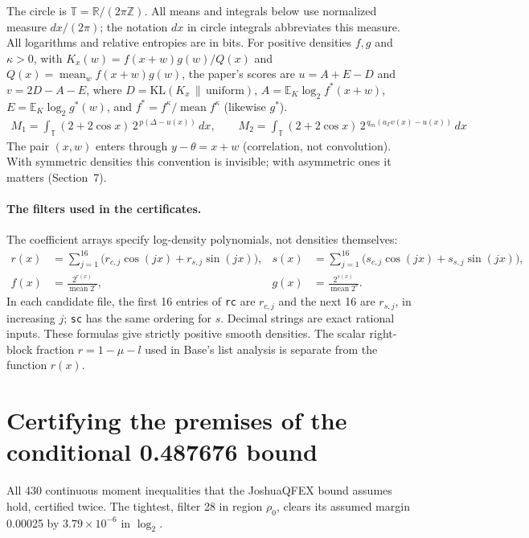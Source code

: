 \documentclass[11pt]{article}
\DeclareMathOperator{\mean}{mean}
\newcommand{\E}{\mathbb{E}}
\newcommand{\KL}{\mathrm{KL}}
\theoremstyle{plain}
\begin{document}
The circle is $\mathbb T=\mathbb R/(2\pi\mathbb Z)$. All means and integrals below use normalized measure $dx/(2\pi)$; the notation $dx$ in circle integrals abbreviates this measure. All logarithms and relative entropies are in bits. For positive densities $f, g$ and $\kappa > 0$, with $K_x(w) = f(x+w)g(w)/Q(x)$ and $Q(x) = \mean_w f(x+w)g(w)$, the paper's scores are $u = A + E - D$ and $v = 2D - A - E$, where $D = \KL(K_x \,\|\, \mathrm{uniform})$, $A = \E_K \log_2 f^*(x+w)$, $E = \E_K \log_2 g^*(w)$, and $f^* = f^\kappa / \mean f^\kappa$ (likewise $g^*$).
\begin{gather*}
M_1 = \int_{\mathbb T} (2+2\cos x)\, 2^{\,p(\Delta - u(x))}\, dx, \qquad M_2 = \int_{\mathbb T} (2+2\cos x)\, 2^{\,q_m(a_\Gamma v(x) - u(x))}\, dx
\end{gather*}
The pair $(x, w)$ enters through $y - \theta = x + w$ (correlation, not convolution). With symmetric densities this convention is invisible; with asymmetric ones it matters (Section~7).

\paragraph{The filters used in the certificates.}
The coefficient arrays specify log-density polynomials, not densities themselves:
\begin{align*}
r(x)&=\sum_{j=1}^{16}\bigl(r_{c,j}\cos(jx)+r_{s,j}\sin(jx)\bigr),&
s(x)&=\sum_{j=1}^{16}\bigl(s_{c,j}\cos(jx)+s_{s,j}\sin(jx)\bigr),\\
f(x)&=\frac{2^{r(x)}}{\mean 2^r},&g(x)&=\frac{2^{s(x)}}{\mean 2^s}.
\end{align*}
In each candidate file, the first 16 entries of \texttt{rc} are $r_{c,j}$ and the next 16 are $r_{s,j}$, in increasing $j$; \texttt{sc} has the same ordering for $s$. Decimal strings are exact rational inputs. These formulas give strictly positive smooth densities. The scalar right-block fraction $r=1-\mu-l$ used in Base's list analysis is separate from the function $r(x)$.


\section{Certifying the premises of the conditional 0.487676 bound}

All 430 continuous moment inequalities that the JoshuaQFEX bound assumes hold, certified twice. The tightest, filter 28 in region $\rho_0$, clears its assumed margin 0.00025 by $3.79\times10^{-6}$ in $\log_2$.
\end{document}
